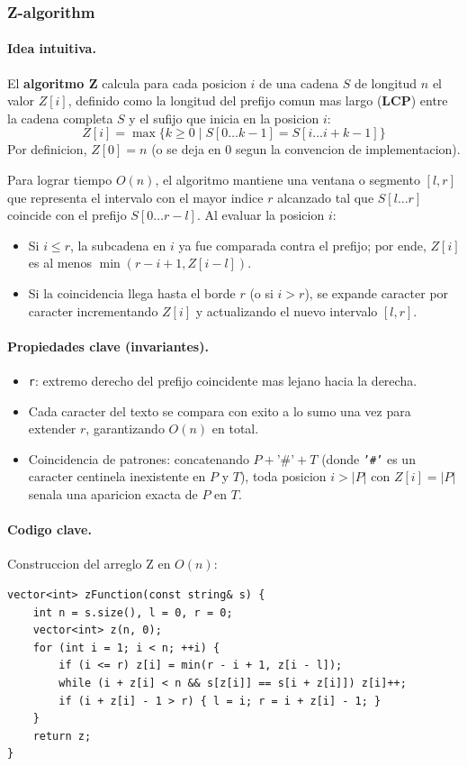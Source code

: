 \subsubsection{Z-algorithm}

\paragraph{Idea intuitiva.}
El \textbf{algoritmo Z} calcula para cada posicion $i$ de una cadena $S$ de longitud $n$ el valor $Z[i]$, definido como la longitud del prefijo comun mas largo (\textbf{LCP}) entre la cadena completa $S$ y el sufijo que inicia en la posicion $i$:
\[
Z[i] = \max \{ k \ge 0 \mid S[0 \dots k-1] = S[i \dots i+k-1] \}
\]
Por definicion, $Z[0] = n$ (o se deja en 0 segun la convencion de implementacion). 

Para lograr tiempo $O(n)$, el algoritmo mantiene una ventana o segmento $[l, r]$ que representa el intervalo con el mayor indice $r$ alcanzado tal que $S[l \dots r]$ coincide con el prefijo $S[0 \dots r-l]$. Al evaluar la posicion $i$:
\begin{itemize}\setlength\itemsep{0pt}
	\item Si $i \le r$, la subcadena en $i$ ya fue comparada contra el prefijo; por ende, $Z[i]$ es al menos $\min(r - i + 1, Z[i - l])$.
	\item Si la coincidencia llega hasta el borde $r$ (o si $i > r$), se expande caracter por caracter incrementando $Z[i]$ y actualizando el nuevo intervalo $[l, r]$.
\end{itemize}

\paragraph{Propiedades clave (invariantes).}
\begin{itemize}\setlength\itemsep{0pt}
	\item \texttt{r}: extremo derecho del prefijo coincidente mas lejano hacia la derecha.
	\item Cada caracter del texto se compara con exito a lo sumo una vez para extender $r$, garantizando $O(n)$ en total.
	\item Coincidencia de patrones: concatenando $P + \text{'\#'} + T$ (donde \texttt{'\#'} es un caracter centinela inexistente en $P$ y $T$), toda posicion $i > |P|$ con $Z[i] = |P|$ senala una aparicion exacta de $P$ en $T$.
\end{itemize}

\paragraph{Codigo clave.}
Construccion del arreglo Z en $O(n)$:
\begin{verbatim}
vector<int> zFunction(const string& s) {
    int n = s.size(), l = 0, r = 0;
    vector<int> z(n, 0);
    for (int i = 1; i < n; ++i) {
        if (i <= r) z[i] = min(r - i + 1, z[i - l]);
        while (i + z[i] < n && s[z[i]] == s[i + z[i]]) z[i]++;
        if (i + z[i] - 1 > r) { l = i; r = i + z[i] - 1; }
    }
    return z;
}
\end{verbatim}

